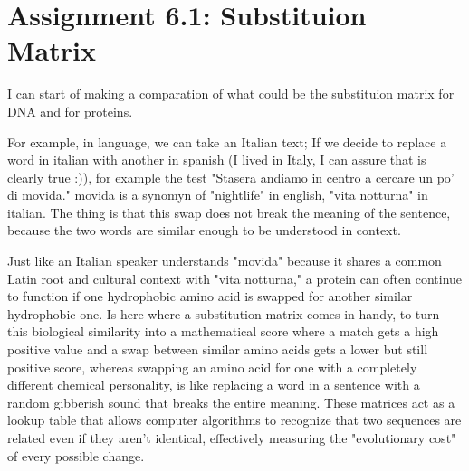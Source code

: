 \chapter{Assignment 6.1: Substituion Matrix}

I can start of making a comparation of what could be the substituion matrix for DNA and for proteins.

For example, in language, we can take an Italian text; If we decide to replace a word in italian with another in spanish (I lived in Italy, I can assure that is clearly true :)),
for example the test "Stasera andiamo in centro a cercare un po' di movida." movida is a synomyn of "nightlife" in english, "vita notturna" in italian.
The thing is that this swap does not break the meaning of the sentence, because the two words are similar enough to be understood in context.

Just like an Italian speaker understands "movida" because it shares a common Latin root and cultural context with "vita notturna," a protein can often continue to function if one hydrophobic amino acid is swapped for another similar hydrophobic one. 
Is here where a substitution matrix comes in handy, to turn this biological similarity into a mathematical score where a match gets a high positive value and a swap between similar amino acids gets a lower but still positive score, 
whereas swapping an amino acid for one with a completely different chemical personality, is like replacing a word in a sentence with a random gibberish sound that breaks the entire meaning. 
These matrices act as a lookup table that allows computer algorithms to recognize that two sequences are related even if they aren't identical, effectively measuring the "evolutionary cost" of every possible change. 
